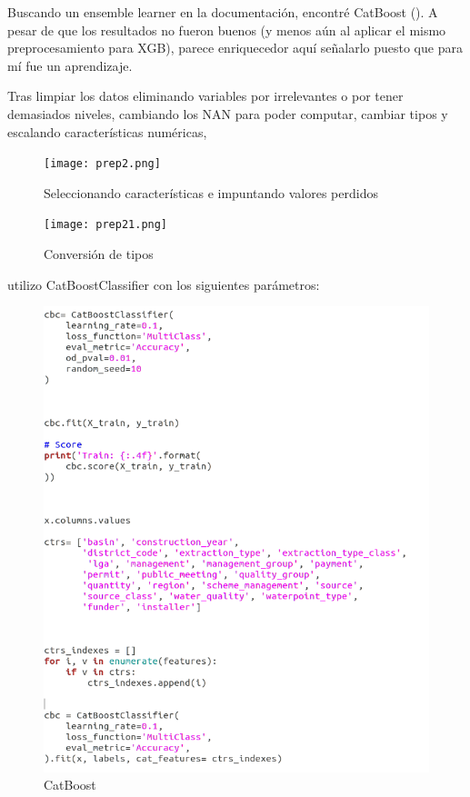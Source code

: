 Buscando un ensemble learner en la documentación, encontré CatBoost (\cite{catboost1}). A pesar de que los resultados no fueron buenos (y menos aún al aplicar el mismo preprocesamiento para XGB), parece enriquecedor aquí señalarlo puesto que para mí fue un aprendizaje.  

Tras limpiar los datos eliminando variables por irrelevantes o por tener demasiados niveles, cambiando los NAN para poder computar, cambiar tipos y escalando características numéricas,

\begin{figure}[H] %
	\centering
	\texttt{[image: prep2.png]}  %
	\caption{Seleccionando características e impuntando valores perdidos} 
	\label{fig:prep-cat1}
\end{figure}

\begin{figure}
	\centering
	\texttt{[image: prep21.png]}  %
	\caption{Conversión de tipos} 
	\label{fig:prep-cat2}
\end{figure}



 utilizo CatBoostClassifier con los siguientes parámetros: 

\begin{figure}[H] %
	\centering
	\includegraphics[scale=0.32]{catboost1.png}  %
	\caption{CatBoost} 
	\label{fig:CB1}
\end{figure}


